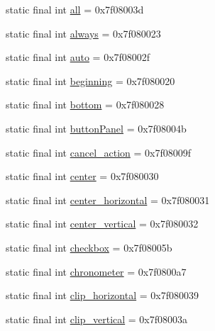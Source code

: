 \begin{CompactItemize}
\item 
static final int \hyperlink{classandroid_1_1support_1_1graphics_1_1drawable_1_1_r_1_1id_d5d155158603ec8ff32a81f95b46c6c5}{all} = 0x7f08003d
\item 
static final int \hyperlink{classandroid_1_1support_1_1graphics_1_1drawable_1_1_r_1_1id_799b76aa023cf2fe080956d6e1e6a72d}{always} = 0x7f080023
\item 
static final int \hyperlink{classandroid_1_1support_1_1graphics_1_1drawable_1_1_r_1_1id_df9e929374b7656bcd1cd1b8ede30610}{auto} = 0x7f08002f
\item 
static final int \hyperlink{classandroid_1_1support_1_1graphics_1_1drawable_1_1_r_1_1id_1a87c1334e2c8ca155468335d2731a10}{beginning} = 0x7f080020
\item 
static final int \hyperlink{classandroid_1_1support_1_1graphics_1_1drawable_1_1_r_1_1id_a2ea37c395f186a12b8b8b27012ec047}{bottom} = 0x7f080028
\item 
static final int \hyperlink{classandroid_1_1support_1_1graphics_1_1drawable_1_1_r_1_1id_a72bd14d4be99321e71159cafdb96a06}{buttonPanel} = 0x7f08004b
\item 
static final int \hyperlink{classandroid_1_1support_1_1graphics_1_1drawable_1_1_r_1_1id_014c7b6b5d02c5ec34af5e123819ed45}{cancel\_\-action} = 0x7f08009f
\item 
static final int \hyperlink{classandroid_1_1support_1_1graphics_1_1drawable_1_1_r_1_1id_b2196f4c465424b23c20ae7ab0034a15}{center} = 0x7f080030
\item 
static final int \hyperlink{classandroid_1_1support_1_1graphics_1_1drawable_1_1_r_1_1id_43a064a854834c8fdb8647f08d3248cd}{center\_\-horizontal} = 0x7f080031
\item 
static final int \hyperlink{classandroid_1_1support_1_1graphics_1_1drawable_1_1_r_1_1id_dd5ff2884f92338e8f8ae89a920e853c}{center\_\-vertical} = 0x7f080032
\item 
static final int \hyperlink{classandroid_1_1support_1_1graphics_1_1drawable_1_1_r_1_1id_1635e3a19cec6038063e1b4e901b076d}{checkbox} = 0x7f08005b
\item 
static final int \hyperlink{classandroid_1_1support_1_1graphics_1_1drawable_1_1_r_1_1id_38138203dce950293a03fa31d32e1225}{chronometer} = 0x7f0800a7
\item 
static final int \hyperlink{classandroid_1_1support_1_1graphics_1_1drawable_1_1_r_1_1id_ab8efd838fe840ce703a2588c81af8bb}{clip\_\-horizontal} = 0x7f080039
\item 
static final int \hyperlink{classandroid_1_1support_1_1graphics_1_1drawable_1_1_r_1_1id_b213cd8ff91b180d99bb2c1db1764d94}{clip\_\-vertical} = 0x7f08003a

\end{CompactItemize}
